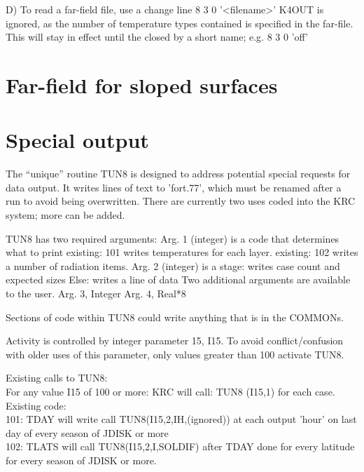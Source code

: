 \documentclass{article}
\begin{document}
D)  To read a far-field file, use a change line \hspace{1cm}  8  3 0 '<filename>'
\qi    K4OUT is ignored, as the number of temperature types contained is specified in the far-file.
\qi   This will stay in effect until the closed by a short name; e.g. \hspace{1cm}      8 3 0 'off'


\section{Far-field for sloped surfaces} 


\section{Special output \label{tun}}
The ``unique'' routine TUN8 is designed to address potential special requests
for data output. It writes lines of text to 'fort.77', which must be renamed
after a run to avoid being overwritten. There are currently two uses coded into
the KRC system; more can be added. 

TUN8 has two required arguments:
\qi Arg. 1 (integer) is a code that determines what to print  
\qii existing: 101 writes temperatures for each layer.
\qii existing: 102 writes a number of radiation items. 
\qi Arg. 2 (integer) is a stage:
 writes case count and expected sizes 
\qii Else: writes a line of data
\qi Two additional arguments are available to the user.
\qii Arg. 3, Integer
\qii Arg. 4, Real*8

Sections of code within TUN8 could write anything that is in the COMMONs.

Activity is controlled by integer parameter 15, I15. To avoid conflict/confusion 
with older uses of this parameter, only values greater than 100 activate TUN8.

Existing calls to TUN8:
\\ For any value I15 of 100 or more: KRC will call: TUN8 (I15,1) for each case. Existing code:
\\ 101: TDAY will write call TUN8(I15,2,IH,(ignored)) at each output 'hour' on last day of every season of JDISK or more 
\\ 102: TLATS will call TUN8(I15,2,I,SOLDIF) after TDAY done for every latitude for every season of JDISK or more.    
\end{document}
